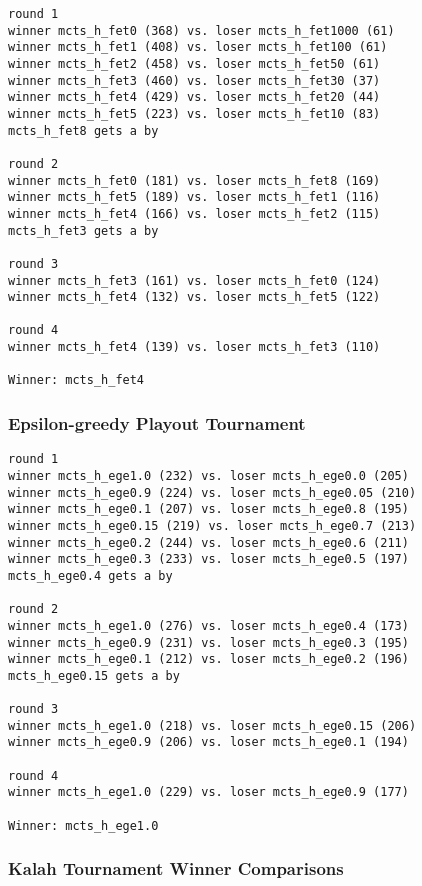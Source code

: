 \documentclass{article}
\begin{document}
\begin{verbatim}
round 1
winner mcts_h_fet0 (368) vs. loser mcts_h_fet1000 (61)
winner mcts_h_fet1 (408) vs. loser mcts_h_fet100 (61)
winner mcts_h_fet2 (458) vs. loser mcts_h_fet50 (61)
winner mcts_h_fet3 (460) vs. loser mcts_h_fet30 (37)
winner mcts_h_fet4 (429) vs. loser mcts_h_fet20 (44)
winner mcts_h_fet5 (223) vs. loser mcts_h_fet10 (83)
mcts_h_fet8 gets a by

round 2
winner mcts_h_fet0 (181) vs. loser mcts_h_fet8 (169)
winner mcts_h_fet5 (189) vs. loser mcts_h_fet1 (116)
winner mcts_h_fet4 (166) vs. loser mcts_h_fet2 (115)
mcts_h_fet3 gets a by

round 3
winner mcts_h_fet3 (161) vs. loser mcts_h_fet0 (124)
winner mcts_h_fet4 (132) vs. loser mcts_h_fet5 (122)

round 4
winner mcts_h_fet4 (139) vs. loser mcts_h_fet3 (110)

Winner: mcts_h_fet4
\end{verbatim}

\subsubsection{Epsilon-greedy Playout Tournament}

\begin{verbatim}
round 1
winner mcts_h_ege1.0 (232) vs. loser mcts_h_ege0.0 (205)
winner mcts_h_ege0.9 (224) vs. loser mcts_h_ege0.05 (210)
winner mcts_h_ege0.1 (207) vs. loser mcts_h_ege0.8 (195)
winner mcts_h_ege0.15 (219) vs. loser mcts_h_ege0.7 (213)
winner mcts_h_ege0.2 (244) vs. loser mcts_h_ege0.6 (211)
winner mcts_h_ege0.3 (233) vs. loser mcts_h_ege0.5 (197)
mcts_h_ege0.4 gets a by

round 2
winner mcts_h_ege1.0 (276) vs. loser mcts_h_ege0.4 (173)
winner mcts_h_ege0.9 (231) vs. loser mcts_h_ege0.3 (195)
winner mcts_h_ege0.1 (212) vs. loser mcts_h_ege0.2 (196)
mcts_h_ege0.15 gets a by

round 3
winner mcts_h_ege1.0 (218) vs. loser mcts_h_ege0.15 (206)
winner mcts_h_ege0.9 (206) vs. loser mcts_h_ege0.1 (194)

round 4
winner mcts_h_ege1.0 (229) vs. loser mcts_h_ege0.9 (177)

Winner: mcts_h_ege1.0
\end{verbatim}

\subsubsection{Kalah Tournament Winner Comparisons}
\end{document}
